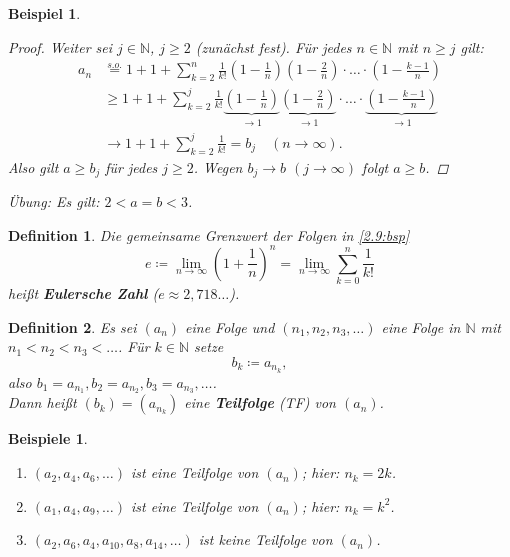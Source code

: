 \documentclass[12pt]{extreport} %
\newcommand{\N}{\mathbb{N}}
\theoremstyle{named}
\theoremstyle{itshape}
\newtheorem*{definition}{Definition}
\theoremstyle{normal}
\newtheorem{beispiel}[unnamedtheorem]{Beispiel}
\newtheorem*{beispiele}{Beispiele}
\begin{document}
\begin{beispiel}
\begin{proof}
		Weiter sei $j \in \N$, $j \geq 2$ (zunächst fest). Für jedes $n \in \N$ mit $n \geq j$ gilt:
		\begin{align*}
			a_{n} & \overset{s.o.}{=} 1 + 1 + \sum_{k=2}^{n} \frac{1}{k!} (1-\frac{1}{n})(1-\frac{2}{n}) \cdot \dotsc \cdot (1-\frac{k-1}{n}) \\
				  & \geq 1 + 1 + \sum_{k = 2}^{j} \frac{1}{k!} \underbrace{(1-\frac{1}{n})}_{\rightarrow 1} 
				  \underbrace{(1-\frac{2}{n})}_{\rightarrow 1} \cdot \dotsc \cdot \underbrace{(1-\frac{k-1}{n})}_{\rightarrow 1} \\
				  & \rightarrow 1 + 1 + \sum_{k=2}^{j} \frac{1}{k!} = b_{j} \quad (n \rightarrow \infty).
		\end{align*}
		Also gilt $a \geq b_{j}$ für jedes $j \geq 2$. Wegen $b_j \to b$ $(j \rightarrow \infty)$ folgt $a \geq b$.
	\end{proof}
	Übung: Es gilt: $2 < a=b < 3$.
\end{beispiel}

\begin{definition} Die gemeinsame Grenzwert der Folgen in \ref{2.9:bsp}
	$$
		e \coloneqq \lim_{n \rightarrow \infty} \left( 1 + \frac{1}{n} \right)^{n} = \lim_{n \rightarrow \infty} \sum_{k = 0}^{n} \frac{1}{k!} 
	$$
	hei{\ss}t \textbf{Eulersche Zahl} ($e \approx 2,718\dotsc$).
\end{definition}

\begin{definition} 
	Es sei $(a_{n})$ eine Folge und $(n_{1}, n_{2}, n_{3}, \dotsc)$ eine Folge in $\N$ mit \\
	$n_{1} < n_{2} < n_{3} < \dotsc$. Für $k \in \N$ setze
	$$
		b_{k} \coloneqq a_{n_{k}},
	$$
	also $b_{1} = a_{n_{1}}, b_{2} = a_{n_{2}}, b_{3} = a_{n_{3}},\dotsc$. \\
	Dann hei{\ss}t $(b_{k}) = (a_{n_{k}})$ eine \textbf{Teilfolge} (TF) von $(a_{n})$.
\end{definition}


\begin{beispiele}\
	\begin{enumerate}
		\item $(a_{2}, a_{4}, a_{6}, \dotsc)$ ist eine Teilfolge von $(a_{n})$; hier: $n_{k} = 2k$.
		\item $(a_{1}, a_{4}, a_{9}, \dotsc)$ ist eine Teilfolge von $(a_{n})$; hier: $n_{k} = k^2$.
		\item $(a_{2}, a_{6}, a_{4}, a_{10}, a_{8}, a_{14}, \dotsc)$ ist keine Teilfolge von $(a_{n})$.
	\end{enumerate}
\end{beispiele}
\end{document}
